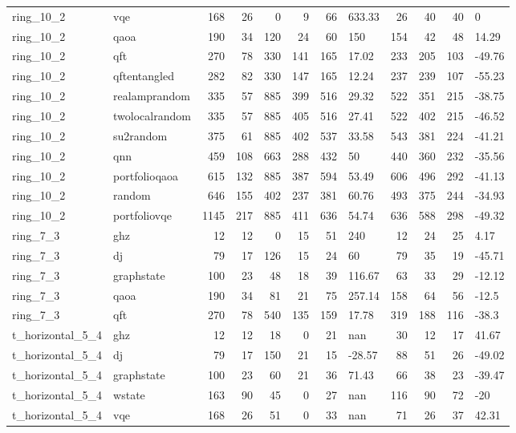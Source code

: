 \begin{longtable}{llrrrrrlrrrl}
ring\_10\_2 & vqe & 168 & 26 & 0 & 9 & 66 & 633.33 & 26 & 40 & 40 & 0 \\
ring\_10\_2 & qaoa & 190 & 34 & 120 & 24 & 60 & 150 & 154 & 42 & 48 & 14.29 \\
ring\_10\_2 & qft & 270 & 78 & 330 & 141 & 165 & 17.02 & 233 & 205 & 103 & -49.76 \\
ring\_10\_2 & qftentangled & 282 & 82 & 330 & 147 & 165 & 12.24 & 237 & 239 & 107 & -55.23 \\
ring\_10\_2 & realamprandom & 335 & 57 & 885 & 399 & 516 & 29.32 & 522 & 351 & 215 & -38.75 \\
ring\_10\_2 & twolocalrandom & 335 & 57 & 885 & 405 & 516 & 27.41 & 522 & 402 & 215 & -46.52 \\
ring\_10\_2 & su2random & 375 & 61 & 885 & 402 & 537 & 33.58 & 543 & 381 & 224 & -41.21 \\
ring\_10\_2 & qnn & 459 & 108 & 663 & 288 & 432 & 50 & 440 & 360 & 232 & -35.56 \\
ring\_10\_2 & portfolioqaoa & 615 & 132 & 885 & 387 & 594 & 53.49 & 606 & 496 & 292 & -41.13 \\
ring\_10\_2 & random & 646 & 155 & 402 & 237 & 381 & 60.76 & 493 & 375 & 244 & -34.93 \\
ring\_10\_2 & portfoliovqe & 1145 & 217 & 885 & 411 & 636 & 54.74 & 636 & 588 & 298 & -49.32 \\
ring\_7\_3 & ghz & 12 & 12 & 0 & 15 & 51 & 240 & 12 & 24 & 25 & 4.17 \\
ring\_7\_3 & dj & 79 & 17 & 126 & 15 & 24 & 60 & 79 & 35 & 19 & -45.71 \\
ring\_7\_3 & graphstate & 100 & 23 & 48 & 18 & 39 & 116.67 & 63 & 33 & 29 & -12.12 \\
ring\_7\_3 & qaoa & 190 & 34 & 81 & 21 & 75 & 257.14 & 158 & 64 & 56 & -12.5 \\
ring\_7\_3 & qft & 270 & 78 & 540 & 135 & 159 & 17.78 & 319 & 188 & 116 & -38.3 \\
t\_horizontal\_5\_4 & ghz & 12 & 12 & 18 & 0 & 21 & nan & 30 & 12 & 17 & 41.67 \\
t\_horizontal\_5\_4 & dj & 79 & 17 & 150 & 21 & 15 & -28.57 & 88 & 51 & 26 & -49.02 \\
t\_horizontal\_5\_4 & graphstate & 100 & 23 & 60 & 21 & 36 & 71.43 & 66 & 38 & 23 & -39.47 \\
t\_horizontal\_5\_4 & wstate & 163 & 90 & 45 & 0 & 27 & nan & 116 & 90 & 72 & -20 \\
t\_horizontal\_5\_4 & vqe & 168 & 26 & 51 & 0 & 33 & nan & 71 & 26 & 37 & 42.31 \\

\end{longtable}
